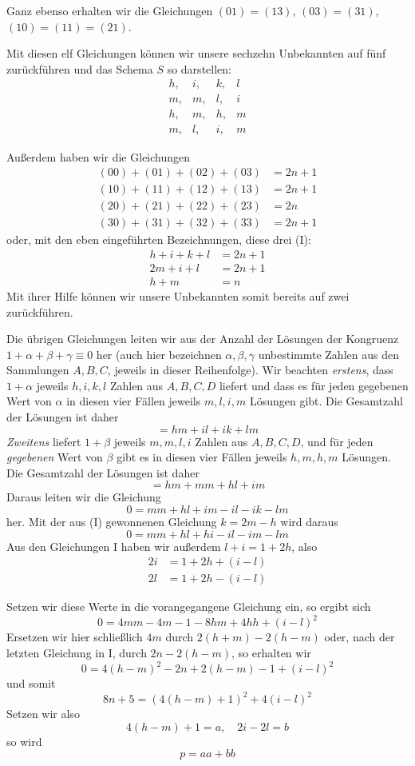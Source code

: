Ganz ebenso erhalten wir die Gleichungen $(01)=(13)$, $(03)=(31)$, $(10)=(11)=(21)$.

Mit diesen elf Gleichungen können wir unsere sechzehn Unbekannten auf fünf zurückführen und das Schema $S$ so darstellen:
\[
\begin{array}{llll}
h,&i,&k,&l\\
m,&m,&l,&i\\
h,&m,&h,&m\\
m,&l,&i,&m
\end{array}
\]


%
Außerdem haben wir die Gleichungen
\[
\begin{aligned}
(00)+(01)+(02)+(03)&=2n+1\\
(10)+(11)+(12)+(13)&=2n+1\\
(20)+(21)+(22)+(23)&=2n\\
(30)+(31)+(32)+(33)&=2n+1
\end{aligned}
\]
oder, mit den eben eingeführten Bezeichnungen, diese drei (I):
\[
\begin{aligned}
h+i+k+l&=2n+1\\
2m+i+l&=2n+1\\
h+m&=n
\end{aligned}
\]
Mit ihrer Hilfe können wir unsere Unbekannten somit bereits auf zwei zurückführen.

Die übrigen Gleichungen leiten wir aus der Anzahl der Lösungen der Kongruenz $1+\alpha+\beta+\gamma\equiv0$ her (auch hier bezeichnen $\alpha,\beta,\gamma$ unbestimmte Zahlen aus den Sammlungen $A,B,C$, jeweils in dieser Reihenfolge). Wir beachten \emph{erstens}, dass $1+\alpha$ jeweils $h,i,k,l$ Zahlen aus $A,B,C,D$ liefert und dass es für jeden gegebenen Wert von $\alpha$ in diesen vier Fällen jeweils $m,l,i,m$ Lösungen gibt. Die Gesamtzahl der Lösungen ist daher
\[
=hm+il+ik+lm
\]
\emph{Zweitens} liefert $1+\beta$ jeweils $m,m,l,i$ Zahlen aus $A,B,C,D$, und für jeden \emph{gegebenen} Wert von $\beta$ gibt es in diesen vier Fällen jeweils $h,m,h,m$ Lösungen. Die Gesamtzahl der Lösungen ist daher
\[
=hm+mm+hl+im
\]
Daraus leiten wir die Gleichung
\[
0=mm+hl+im-il-ik-lm
\]
her. Mit der aus (I) gewonnenen Gleichung $k=2m-h$ wird daraus
\[
0=mm+hl+hi-il-im-lm
\]
Aus den Gleichungen I haben wir außerdem $l+i=1+2h$, also
\[
\begin{aligned}
2i&=1+2h+(i-l)\\
2l&=1+2h-(i-l)
\end{aligned}
\]

%
Setzen wir diese Werte in die vorangegangene Gleichung ein, so ergibt sich
\[
0=4mm-4m-1-8hm+4hh+(i-l)^2
\]
Ersetzen wir hier schließlich $4m$ durch $2(h+m)-2(h-m)$ oder, nach der letzten Gleichung in I, durch $2n-2(h-m)$, so erhalten wir
\[
0=4(h-m)^2-2n+2(h-m)-1+(i-l)^2
\]
und somit
\[
8n+5=(4(h-m)+1)^2+4(i-l)^2
\]
Setzen wir also
\[
4(h-m)+1=a,\quad2i-2l=b
\]
so wird
\[
p=aa+bb
\]

